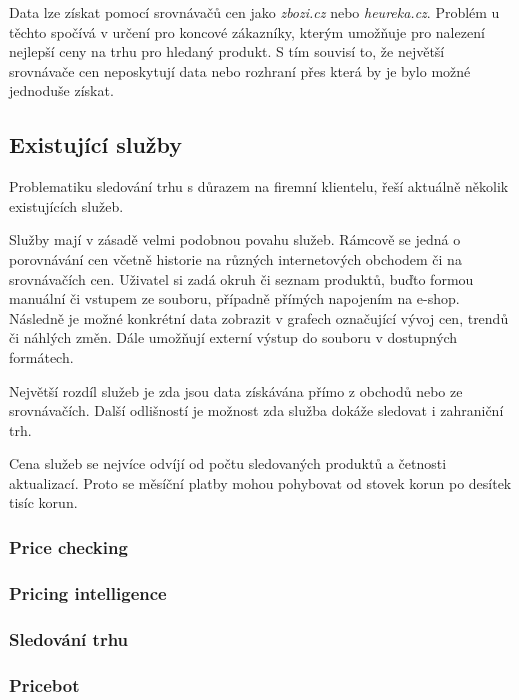 \documentclass[thesis=B,czech]{FITthesis}[2012/06/26]
\begin{document}
Data lze získat pomocí srovnávačů cen jako \textit{zbozi.cz}\cite{heureka} 
nebo \textit{heureka.cz}\cite{zbozi}. Problém u těchto spočívá v určení pro koncové zákazníky, kterým umožňuje
pro nalezení nejlepší ceny na trhu pro hledaný produkt. S tím souvisí to, že největší srovnávače cen neposkytují data nebo
rozhraní přes která by je bylo možné jednoduše získat.

\subsection{Existující služby}

Problematiku sledování trhu s důrazem na firemní klientelu, řeší aktuálně několik existujících služeb.
\par
Služby mají v zásadě velmi podobnou povahu služeb. Rámcově se jedná o porovnávání cen včetně historie na různých internetových
obchodem či na srovnávačích cen. Uživatel si zadá okruh či seznam produktů, buďto formou manuální či vstupem ze souboru, případně 
přímých napojením na e-shop. Následně je možné konkrétní data zobrazit v grafech označující vývoj cen, trendů či náhlých změn.
Dále umožňují externí výstup do souboru v dostupných formátech.
\par
Největší rozdíl služeb je zda jsou data získávána přímo z obchodů nebo ze srovnávačích. Další odlišností je 
možnost zda služba dokáže sledovat i zahraniční trh.
\par
Cena služeb se nejvíce odvíjí od počtu sledovaných produktů a četnosti aktualizací. Proto se měsíční platby mohou 
pohybovat od stovek korun po desítek tisíc korun.

\subsubsection{Price checking}

\subsubsection{Pricing intelligence}

\subsubsection{Sledování trhu}

\subsubsection{Pricebot}
\end{document}
